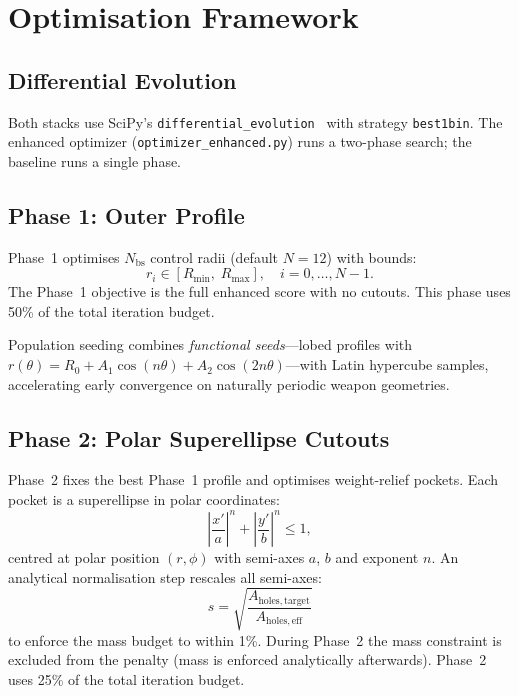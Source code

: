 \documentclass[10pt,twocolumn]{article}
\begin{document}
\section{Optimisation Framework}
\label{sec:optim}

\subsection{Differential Evolution}
\label{sec:de}

Both stacks use SciPy's \texttt{differential\_evolution}~\cite{storn1997de}
with strategy \texttt{best1bin}.  The enhanced optimizer
(\texttt{optimizer\_enhanced.py}) runs a two-phase search; the baseline runs
a single phase.

\subsection{Phase 1: Outer Profile}
\label{sec:phase1}

Phase~1 optimises $N_{\mathrm{bs}}$ control radii (default $N{=}12$) with
bounds:
\begin{equation}
  r_i \in [R_{\min},\; R_{\max}], \quad i = 0, \ldots, N-1.
\end{equation}
The Phase~1 objective is the full enhanced score with no cutouts.  This phase
uses 50\% of the total iteration budget.

Population seeding combines \emph{functional seeds}---lobed profiles with
$r(\theta) = R_0 + A_1\cos(n\theta) + A_2\cos(2n\theta)$---with Latin
hypercube samples, accelerating early convergence on naturally periodic
weapon geometries.

\subsection{Phase 2: Polar Superellipse Cutouts}
\label{sec:phase2}

Phase~2 fixes the best Phase~1 profile and optimises weight-relief pockets.
Each pocket is a superellipse in polar coordinates:
\begin{equation}
  \left|\frac{x'}{a}\right|^n + \left|\frac{y'}{b}\right|^n \leq 1,
\end{equation}
centred at polar position $(r, \phi)$ with semi-axes $a$, $b$ and exponent
$n$.  An analytical normalisation step rescales all semi-axes:
\begin{equation}
  s = \sqrt{\frac{A_{\mathrm{holes,target}}}{A_{\mathrm{holes,eff}}}}
\end{equation}
to enforce the mass budget to within 1\%.  During Phase~2 the mass constraint
is excluded from the penalty (mass is enforced analytically afterwards).
Phase~2 uses 25\% of the total iteration budget.
\end{document}
